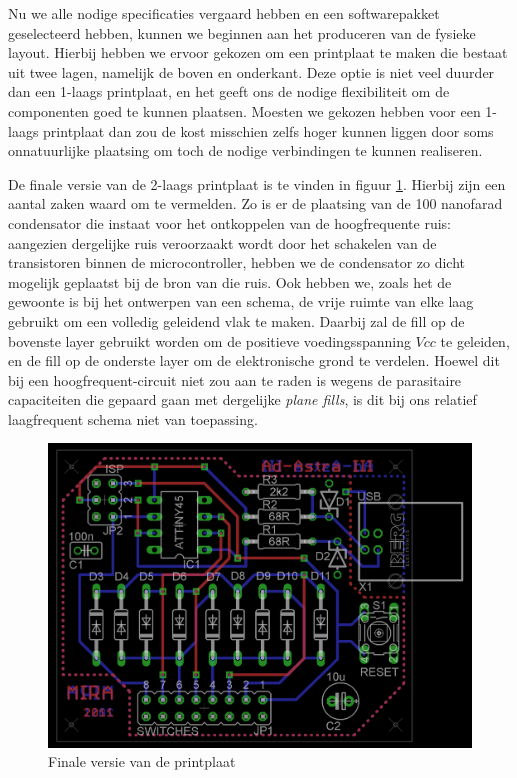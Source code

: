 Nu we alle nodige specificaties vergaard hebben en een softwarepakket geselecteerd hebben, kunnen we beginnen aan het produceren van de fysieke layout. Hierbij hebben we ervoor gekozen om een printplaat te maken die bestaat uit twee lagen, namelijk de boven en onderkant. Deze optie is niet veel duurder dan een 1-laags printplaat, en het geeft ons de nodige flexibiliteit om de componenten goed te kunnen plaatsen. Moesten we gekozen hebben voor een 1-laags printplaat dan zou de kost misschien zelfs hoger kunnen liggen door soms onnatuurlijke plaatsing om toch de nodige verbindingen te kunnen realiseren. 

De finale versie van de 2-laags printplaat is te vinden in figuur \ref{fig:printplaat}. Hierbij zijn een aantal zaken waard om te vermelden. Zo is er de plaatsing van de 100 nanofarad condensator die instaat voor het ontkoppelen van de hoogfrequente ruis: aangezien dergelijke ruis veroorzaakt wordt door het schakelen van de transistoren binnen de microcontroller, hebben we de condensator zo dicht mogelijk geplaatst bij de bron van die ruis. Ook hebben we, zoals het de gewoonte is bij het ontwerpen van een schema, de vrije ruimte van elke laag gebruikt om een volledig geleidend vlak te maken. Daarbij zal de fill op de bovenste layer gebruikt worden om de positieve voedingsspanning $Vcc$ te geleiden, en de fill op de onderste layer om de elektronische grond te verdelen. Hoewel dit bij een hoogfrequent-circuit niet zou aan te raden is wegens de parasitaire capaciteiten die gepaard gaan met dergelijke \emph{plane fills}, is dit bij ons relatief laagfrequent schema niet van toepassing.

\begin{figure}
	\includegraphics[width=\textwidth]{afbeeldingen/inputmodule_pcb}
	\caption{Finale versie van de printplaat}
	\label{fig:printplaat}
\end{figure}

